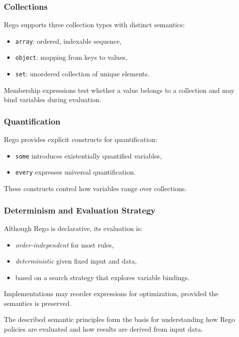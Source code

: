 \subsubsection{Collections}

Rego supports three collection types with distinct semantics:
\begin{itemize}
  \item \texttt{array}: ordered, indexable sequence,
  \item \texttt{object}: mapping from keys to values,
  \item \texttt{set}: unordered collection of unique elements.
\end{itemize}

Membership expressions test whether a value belongs to a collection and may bind variables during evaluation.

\subsubsection{Quantification}

Rego provides explicit constructs for quantification:
\begin{itemize}
  \item \texttt{some} introduces existentially quantified variables,
  \item \texttt{every} expresses universal quantification.
\end{itemize}

These constructs control how variables range over collections.

\subsubsection{Determinism and Evaluation Strategy}

Although Rego is declarative, its evaluation is:
\begin{itemize}
  \item \emph{order-independent} for most rules,
  \item \emph{deterministic} given fixed input and data,
  \item based on a search strategy that explores variable bindings.
\end{itemize}

Implementations may reorder expressions for optimization, provided the semantics is preserved.

\medskip

The described semantic principles form the basis for understanding how Rego policies are evaluated and how results are derived from input data.




